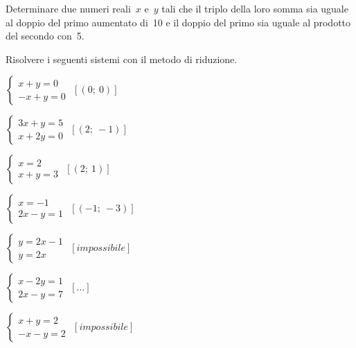 \begin{esercizio}
 \label{ese:22.15}
Determinare due numeri reali~$x$ e~$y$ tali che il
triplo della loro somma sia uguale al doppio del primo aumentato di~10
e il doppio del primo sia uguale al prodotto del secondo con~5.
 \end{esercizio}


 \begin{esercizio}[\Ast]
 \label{ese:22.20}
Risolvere i seguenti sistemi con il metodo di riduzione.

\begin{multicols}{2}
 \begin{enumeratea}
 \item $\left\{\begin{array}{l}x+y=0\\-x+y=0\end{array}\right.$
 \hfill $\left[(0;~0)\right]$
\item $\left\{\begin{array}{l}3x+y=5\\x+2y=0\end{array}\right.$
 \hfill $\left[(2;~-1)\right]$
\item $\left\{\begin{array}{l}x=2\\x+y=3\end{array}\right.$
 \hfill $\left[(2;~1)\right]$
\item $\left\{\begin{array}{l}x=-1\\2x-y=1\end{array}\right.$
 \hfill $\left[(-1;~-3)\right]$
 \item $\left\{\begin{array}{l}y=2x-1\\y=2x\end{array}\right.$
 \hfill $\left[impossibile\right]$
\item $\left\{\begin{array}{l}x-2y=1\\2x-y=7\end{array}\right.$
 \hfill $\left[...\right]$
\item $\left\{\begin{array}{l}x+y=2\\-x-y=2\end{array}\right.$
 \hfill $\left[impossibile\right]$

\end{enumeratea}
\end{multicols}
\end{esercizio}
